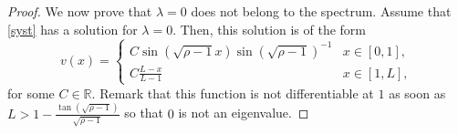 \documentclass[11pt]{article}
\theoremstyle{plain}
\begin{document}
\begin{proof}
We now prove that $\lambda=0$  does not belong to the spectrum. Assume that \eqref{syst} has a solution for $\lambda=0$. Then, this solution is of the form
\begin{equation*}
v(x)=\begin{cases}
C\sin\left(\sqrt{\rho-1}x\right)\sin\left(\sqrt{\rho-1}\right)^{-1} &  x\in[0,1],\\
C\frac{L-x}{L-1} &  x\in[1,L],
\end{cases}
\end{equation*}
for some $C\in \mathbb{R}.$ Remark that this function is not differentiable at $1$ as soon as  $L>1-\frac{\tan(\sqrt{\rho-1})}{\sqrt{\rho-1}}$ so that $0$ is not an eigenvalue. 
  

\end{proof}
\end{document}
